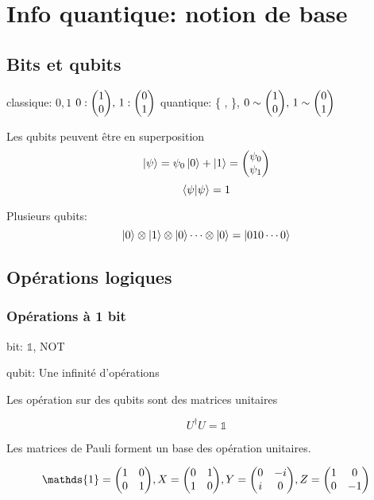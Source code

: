 \section{Info quantique: notion de base}

\subsection{Bits et qubits}

\begin{center}
	classique: ${0,1}$ $0:\mqty(1\\0),\, 1: \mqty(0\\1)$ \qquad quantique: \{ ,   \}, $0 \sim \mqty(1\\0),\, 1 \sim \mqty(0\\1)$

\end{center}
	Les qubits peuvent être en superposition 
	\[ \ket{\psi} = \psi_0 \ket{0} + \ket{1} = \mqty(\psi_0 \\\psi_1) \]
	\[ \bra{\psi}\ket{\psi} = 1\]
	
	Plusieurs qubits: \[ \ket{0} \otimes \ket{1} \otimes \ket{0} \dotsb \otimes \ket{0} = \ket{010\dotsb0} \]

\subsection{Opérations logiques}

\subsubsection{Opérations à 1 bit}

\begin{center}
	
bit: $\mathds{1}$, NOT

qubit: Une infinité d'opérations
\end{center}

Les opération sur des qubits sont des matrices unitaires 

\[ U^{\dagger}U = \mathds{1} \]

Les matrices de Pauli forment un base des opération unitaires.




\[ \mathds{1} = \mqty(1 & 0\\ 0& 1),  X = \mqty(0 &1 \\ 1 &0), Y= \mqty(0 & -i \\ i &0), Z = \mqty(1 & 0 \\ 0 &-1) \]


